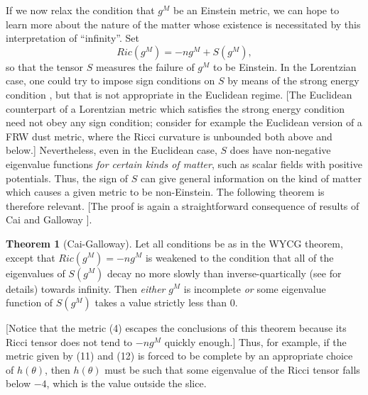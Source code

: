 \documentclass[a4paper,12pt]{article}
\theoremstyle{definition}
\newtheorem{thm}{Theorem}
\renewcommand{\u}{\textit}
\renewcommand{\-}{$\dfrac{\quad\enspace}{\quad}$}
\begin{document}
If we now relax the condition that $g^M$ be an Einstein metric, we can hope to learn
more about the nature of the matter whose existence is necessitated by this interpretation
of ``infinity''. Set 
\begin{equation}
Ric(g^M)=-ng^M+S(g^M),
\end{equation}
so that the tensor $S$ measures the failure of $g^M$ to be Einstein. In the Lorentzian case,
one could try to impose sign conditions on $S$ by means of the strong energy condition
\cite{10}, but that is not appropriate in the Euclidean regime. [The Euclidean counterpart
of a Lorentzian metric which satisfies the strong energy condition need not obey any sign
condition; consider for example the Euclidean version of a FRW dust metric, where the
Ricci curvature is unbounded both above and below.] Nevertheless, even in the Euclidean
case, $S$ does have non-negative eigenvalue functions \u{for certain kinds of matter}, 
such as scalar fields with positive potentials. Thus, the sign of $S$ can give general
information on the kind of matter which causes a given metric to be non-Einstein. The
following theorem is therefore relevant. [The proof is again a straightforward consequence 
of results of Cai and Galloway \cite{5}].
\begin{thm}[Cai-Galloway]
Let all conditions be as in the WYCG theorem, except that $Ric(g^M)=-ng^M$ is weakened to the condition that all of the eigenvalues of $S(g^M)$ decay no more slowly than inverse-quartically (see \cite{5} for details) towards infinity. Then \u{either} $g^M$ is incomplete \u{or} some eigenvalue function of $S(g^M)$ takes a value strictly less than $0$.
\end{thm}
[Notice that the metric (4) escapes the conclusions of this theorem because its Ricci
tensor does not tend to $-ng^M$ quickly enough.] Thus, for example, if the metric given by
(11) and (12) is forced to be complete by an appropriate choice of $h(\theta)$, then
$h(\theta)$ must be such that some eigenvalue of the Ricci tensor falls below $-4$, which
is the value outside the slice.
\end{document}
